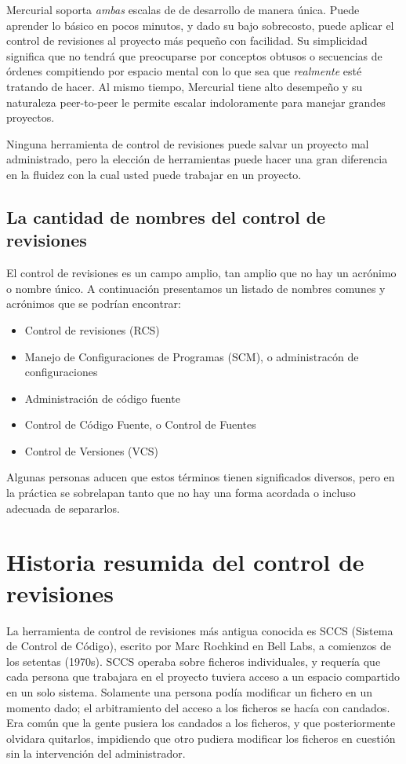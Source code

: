 Mercurial soporta \emph{ambas} escalas de de desarrollo de manera
única. Puede aprender lo básico en pocos minutos, y dado su bajo
sobrecosto, puede aplicar el control de revisiones al proyecto más
pequeño con facilidad. Su simplicidad significa que no tendrá que
preocuparse por conceptos obtusos o secuencias de órdenes compitiendo
por espacio mental con lo que sea que \emph{realmente} esté tratando
de hacer.  Al mismo tiempo, Mercurial tiene alto desempeño y su
naturaleza peer-to-peer le permite escalar indoloramente para manejar
grandes proyectos.

Ninguna herramienta de control de revisiones puede salvar un
proyecto mal administrado, pero la elección de herramientas puede
hacer una gran diferencia en la fluidez con la cual usted puede
trabajar en un proyecto.

\subsection{La cantidad de nombres del control de revisiones}

El control de revisiones es un campo amplio, tan amplio que no hay un
acrónimo o nombre único. A continuación presentamos un listado de
nombres comunes y acrónimos que se podrían encontrar:
\begin{itemize}
\item Control de revisiones (RCS)
\item Manejo de Configuraciones de Programas (SCM), o administracón de
  configuraciones
\item Administración de código fuente
\item Control de Código Fuente, o Control de Fuentes
\item Control de Versiones (VCS)
\end{itemize}
Algunas personas aducen que estos términos tienen significados
diversos, pero en la práctica se sobrelapan tanto que no hay una
forma acordada o incluso adecuada de separarlos.

\section{Historia resumida del control de revisiones}

La herramienta de control de revisiones más antigua conocida es SCCS 
(Sistema de Control de Código), escrito por Marc Rochkind en Bell
Labs, a comienzos de los setentas (1970s).  SCCS operaba sobre ficheros
individuales, y requería que cada persona que trabajara en el proyecto
tuviera acceso a un espacio compartido en un solo sistema.  Solamente
una persona podía modificar un fichero en un momento dado; el
arbitramiento del acceso a los ficheros se hacía con candados. Era
común que la gente pusiera los candados a los ficheros, y que
posteriormente olvidara quitarlos, impidiendo que otro pudiera
modificar los ficheros en cuestión sin la intervención del
administrador.

